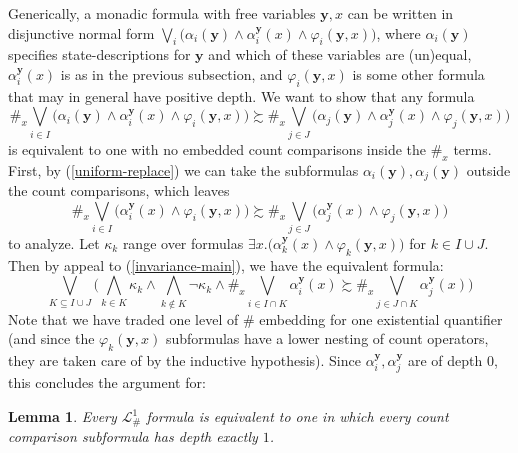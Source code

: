 \documentclass[12pt,oneside,reqno]{amsart}
\newtheorem{lemma}{Lemma}
\theoremstyle{definition}
\begin{document}
Generically, a monadic formula with free variables $\mathbf{y},x$ can be written in disjunctive normal form $\bigvee_i \big(\alpha_i(\mathbf{y}) \wedge \alpha^{\mathbf{y}}_i(x) \wedge \varphi_i(\mathbf{y},x)\big)$, where $\alpha_i(\mathbf{y})$ specifies state-descriptions for $\mathbf{y}$ and which of these variables are (un)equal, $\alpha^{\mathbf{y}}_i(x)$ is as in the previous subsection, and $\varphi_i(\mathbf{y},x)$ is some other formula that may in general have positive depth. We want to show that any formula \begin{equation*}
    \#_x\bigvee_{i\in I} \big(\alpha_i(\mathbf{y}) \wedge \alpha^{\mathbf{y}}_i(x) \wedge \varphi_i(\mathbf{y},x)\big)\succsim \#_x\bigvee_{j\in J} \big(\alpha_j(\mathbf{y}) \wedge \alpha^{\mathbf{y}}_j(x) \wedge \varphi_j(\mathbf{y},x)\big)
\end{equation*} is equivalent to one with no embedded count comparisons inside the $\#_x$ terms. %
First, by (\ref{uniform-replace}) we can take the subformulas  $\alpha_i(\mathbf{y}),\alpha_j(\mathbf{y})$ outside the count comparisons, which leaves
\begin{equation*}
    \#_x\bigvee_{i\in I} \big(\alpha^{\mathbf{y}}_i(x) \wedge \varphi_i(\mathbf{y},x)\big) \succsim \#_x\bigvee_{j\in J} \big( \alpha_j^{\mathbf{y}}(x) \wedge \varphi_j(\mathbf{y},x)\big) \label{toward-normal}
\end{equation*} to analyze. Let $\kappa_k$ range over formulas $\exists x.\big(\alpha_k^{\mathbf{y}}(x) \wedge \varphi_k(\mathbf{y},x)\big)$ for $k \in I \cup J$. Then by appeal to (\ref{invariance-main}), we have the equivalent formula:
\begin{equation*}
    \bigvee_{K \subseteq I \cup J}\big(\bigwedge_{k \in K}\kappa_k \wedge \bigwedge_{k \notin K} \neg \kappa_k \wedge \#_x\bigvee_{i\in I\cap K} \alpha^{\mathbf{y}}_i(x) \succsim \#_x\bigvee_{j\in J \cap K}  \alpha_j^{\mathbf{y}}(x) \big)
\end{equation*}
Note that we have traded one level of $\#$ embedding for one existential quantifier (and since the $\varphi_k(\mathbf{y},x)$ subformulas have  a lower  nesting of count operators, they are taken care of by the inductive hypothesis). Since $\alpha_i^{\mathbf{y}},\alpha_j^{\mathbf{y}}$ are of depth $0$, this concludes the argument for:
\begin{lemma} Every $\mathcal{L}_\#^1$ formula is equivalent %
to one in which every count comparison subformula has depth exactly $1$. \label{lemma:depth1}
\end{lemma}
\end{document}
